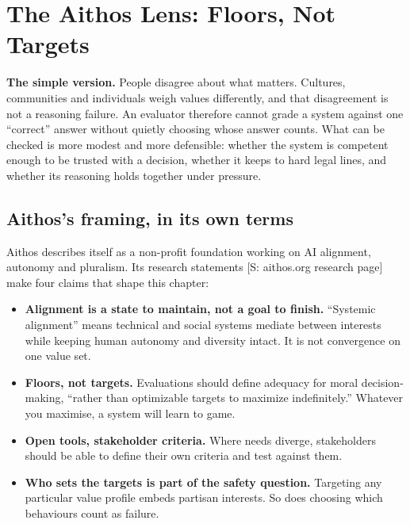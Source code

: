 \section{The Aithos Lens: Floors, Not Targets}
\tierR
\textbf{The simple version.} People disagree about what matters. Cultures, communities and individuals weigh values differently, and that disagreement is not a reasoning failure. An evaluator therefore cannot grade a system against one ``correct'' answer without quietly choosing whose answer counts. What can be checked is more modest and more defensible: whether the system is competent enough to be trusted with a decision, whether it keeps to hard legal lines, and whether its reasoning holds together under pressure.

\subsection{Aithos's framing, in its own terms}
Aithos describes itself as a non-profit foundation working on AI alignment, autonomy and pluralism. Its research statements [S: aithos.org research page] make four claims that shape this chapter:
\begin{itemize}
\item \textbf{Alignment is a state to maintain, not a goal to finish.} ``Systemic alignment'' means technical and social systems mediate between interests while keeping human autonomy and diversity intact. It is not convergence on one value set.
\item \textbf{Floors, not targets.} Evaluations should define adequacy for moral decision-making, ``rather than optimizable targets to maximize indefinitely.'' Whatever you maximise, a system will learn to game.
\item \textbf{Open tools, stakeholder criteria.} Where needs diverge, stakeholders should be able to define their own criteria and test against them.
\item \textbf{Who sets the targets is part of the safety question.} Targeting any particular value profile embeds partisan interests. So does choosing which behaviours count as failure.
\end{itemize}

